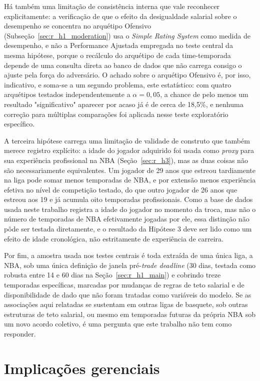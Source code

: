 Há também uma limitação de consistência interna que vale reconhecer explicitamente: a verificação de que o efeito da desigualdade salarial sobre o desempenho se concentra no arquétipo Ofensivo (Subseção~\ref{sec:r_h1_moderation}) usa o \textit{Simple Rating System} como medida de desempenho, e não a Performance Ajustada empregada no teste central da mesma hipótese, porque o recálculo do arquétipo de cada time-temporada depende de uma consulta direta ao banco de dados que não carrega consigo o ajuste pela força do adversário. O achado sobre o arquétipo Ofensivo é, por isso, indicativo, e soma-se a um segundo problema, este estatístico: com quatro arquétipos testados independentemente a $\alpha = 0{,}05$, a chance de pelo menos um resultado "significativo" aparecer por acaso já é de cerca de 18,5\%, e nenhuma correção para múltiplas comparações foi aplicada nesse teste exploratório específico.

A terceira hipótese carrega uma limitação de validade de construto que também merece registro explícito: a idade do jogador adquirido foi usada como \textit{proxy} para sua experiência profissional na NBA (Seção~\ref{sec:r_h3}), mas as duas coisas não são necessariamente equivalentes. Um jogador de 29 anos que estreou tardiamente na liga pode somar menos temporadas de NBA, e por extensão menos experiência efetiva no nível de competição testado, do que outro jogador de 26 anos que estreou aos 19 e já acumula oito temporadas profissionais. Como a base de dados usada neste trabalho registra a idade do jogador no momento da troca, mas não o número de temporadas de NBA efetivamente jogadas por ele, essa distinção não pôde ser testada diretamente, e o resultado da Hipótese 3 deve ser lido como um efeito de idade cronológica, não estritamente de experiência de carreira.

Por fim, a amostra usada nos testes centrais é toda extraída de uma única liga, a NBA, sob uma única definição de janela pré-\textit{trade deadline} (30 dias, testada como robusta entre 14 e 60 dias na Seção~\ref{sec:r_h1_main}) e cobrindo treze temporadas específicas, marcadas por mudanças de regras de teto salarial e de disponibilidade de dado que não foram tratadas como variáveis do modelo. Se as associações aqui relatadas se sustentam em outras ligas de basquete, sob outras estruturas de teto salarial, ou mesmo em temporadas futuras da própria NBA sob um novo acordo coletivo, é uma pergunta que este trabalho não tem como responder.

\section{Implicações gerenciais}
\label{sec:managerial_implications}

